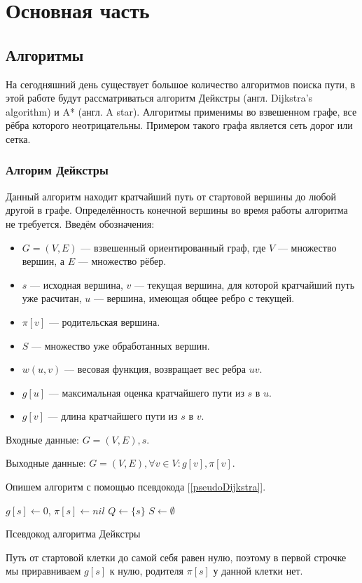 \section{Основная часть}
\subsection{Алгоритмы}
На сегодняшний день существует большое количество алгоритмов поиска пути, в этой работе будут рассматриваться алгоритм Дейкстры (англ. Dijkstra’s algorithm) и A* (англ. A star). Алгоритмы применимы во взвешенном графе, все рёбра которого неотрицательны. Примером такого графа является сеть дорог или сетка. 
\subsubsection{Алгорим Дейкстры}
Данный алгоритм находит кратчайший путь от стартовой вершины до любой другой в графе. Определённость конечной вершины во время работы алгоритма не требуется.
Введём обозначения:
\begin{itemize}
    \item $G = (V,E)$ — взвешенный ориентированный граф, где $V$ — множество вершин, а $E$ — множество рёбер.
    \item $s$ — исходная вершина, $v$ — текущая вершина, для которой кратчайший путь уже расчитан, $u$ — вершина, имеющая общее ребро с текущей.
    \item $\pi[v]$ — родительская вершина.
    \item $S$ — множество уже обработанных вершин.
    \item $w(u,v)$ — весовая функция, возвращает вес ребра $uv$.
    \item $g[u]$ — максимальная оценка кратчайшего пути из $s$ в $u$.
    \item $g[v]$ — длина кратчайшего пути из $s$ в $v$.

\end{itemize}

Входные данные: $G = (V,E), s$.

Выходные данные: $G = (V,E),  \forall v \in V: g[v],\pi[v]$.

Опишем алгоритм с помощью псевдокода [\ref{pseudoDijkstra}].

\begin{algorithm}

\DontPrintSemicolon
$g[s]\gets 0$, $\pi[s] \gets nil$\;
$Q \gets \{s\}$\;
$S \gets \emptyset$\;


\caption{Псевдокод алгоритма Дейкстры}
\label{pseudoDijkstra}
\end{algorithm}
Путь от стартовой клетки до самой себя равен нулю, поэтому в первой строчке мы приравниваем $g[s]$ к нулю, родителя $\pi[s]$ у данной клетки нет.

